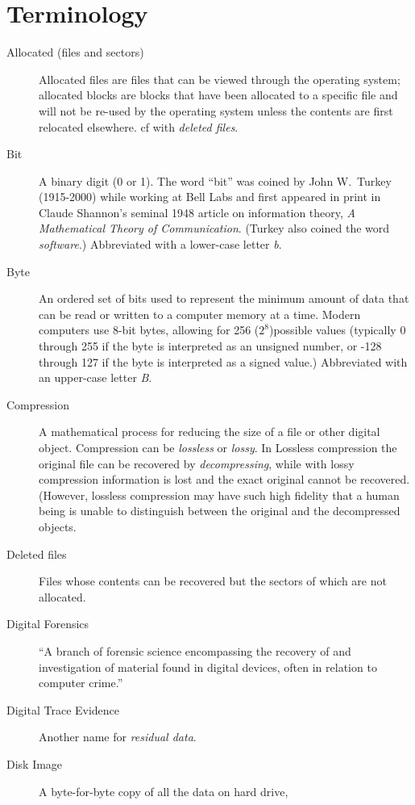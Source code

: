 \chapter{Terminology}
\begin{description}
\item[Allocated (files and sectors)] Allocated files are files that can be viewed through
  the operating system; allocated blocks are blocks that have been
  allocated to a specific file and will not be re-used by the
  operating system unless the contents are first relocated
  elsewhere. cf with \emph{deleted files}.
\item[Bit] A binary digit (0 or 1). The word ``bit'' was coined by
  John W.\ Turkey (1915-2000) while working at Bell Labs and first appeared in
  print in Claude Shannon's seminal 1948 article on information
  theory, \emph{A Mathematical Theory of Communication}. (Turkey also
  coined the word \emph{software}.) Abbreviated with a lower-case
  letter \emph{b}.
\item[Byte] An ordered set of bits used to represent the minimum
  amount of data that can be read or written to a computer memory at a
  time. Modern computers use 8-bit bytes, allowing for 256
  ($2^8$)possible values (typically 0 through 255 if the byte is
  interpreted as an unsigned number, or -128 through 127 if the byte
  is interpreted as a signed value.) Abbreviated with an upper-case
  letter \emph{B}.
\item[Compression] A mathematical process for reducing the size of a
  file or other digital object. Compression can be \emph{lossless} or
  \emph{lossy}. In Lossless compression the original file can be recovered by
  \emph{decompressing}, while with lossy compression information is
  lost and the exact original cannot be recovered. (However, lossless
  compression may have such high fidelity that a human being is unable
  to distinguish between the original and the decompressed objects.
\item[Deleted files] Files whose contents can be recovered but the
  sectors of which are not allocated.
\item[Digital Forensics] ``A branch of forensic science encompassing the
  recovery of and investigation of material
  found in digital devices, often in relation to computer crime.''\cite{reith:examination}
\item[Digital Trace Evidence] Another name for \emph{residual data}.
\item[Disk Image] A byte-for-byte copy of all the data on hard drive,

\end{description}
